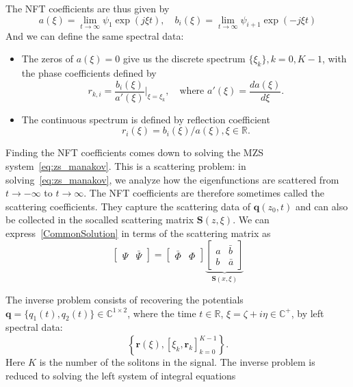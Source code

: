 The NFT coefficients are thus given by
$$
a(\xi)=\lim _{t \rightarrow \infty} \psi_1 \exp (j \xi t), \quad b_i(\xi)=\lim _{t \rightarrow \infty} \psi_{i+1} \exp (-j \xi t)
$$
And we can define the same spectral data:
\begin{itemize}
    \item The zeros of \(a(\xi) = 0\) give us the discrete spectrum \(\{\xi_k\}, k = 0, K - 1\),
    with the phase coefficients defined by
    \begin{equation}
        r_{k,i} = \frac{b_i(\xi)}{a'(\xi)} \Bigg|_{\xi=\xi_k}, \quad \text{where } a'(\xi) = \frac{da(\xi)}{d \xi}.
        \label{eq:manakov_rk}
    \end{equation}
    \item The continuous spectrum is defined by reflection coefficient 
    \begin{equation}
        r_i(\xi) = b_i(\xi)/a(\xi), \xi \in \mathbb{R} {.}
        \label{eq:manakov_r}
    \end{equation}
\end{itemize}

Finding the NFT coefficients comes down to solving the MZS system~\eqref{eq:zs_manakov}. This is a scattering problem: in solving~\eqref{eq:zs_manakov}, we analyze how the eigenfunctions are scattered from $t \rightarrow-\infty$ to $t \rightarrow \infty$. The NFT coefficients are therefore sometimes called the scattering coefficients. They capture the scattering data of $\mathbf{q}\left(z_0, t\right)$ and can also be collected in the socalled scattering matrix $\mathbf{S}(z, \xi)$. We can express~\eqref{CommonSolution} in terms of the scattering matrix as
$$
\left[\begin{array}{ll}
\Psi & \bar{\Psi}
\end{array}\right]=\left[\begin{array}{ll}
\bar{\Phi} & \Phi
\end{array}\right] \underbrace{\left[\begin{array}{cc}
a & \bar{b} \\
b & \bar{a}
\end{array}\right]}_{\mathbf{S}(x, \xi)}
$$

%
The inverse problem consists of recovering the potentials $\mathbf{q} = \{q_1(t), q_2(t)\}\in \mathbb{C}^{1\times2}$, where the time $t \in \mathbb{R}$, $\xi=\zeta+i \eta \in \mathbb{C}^{+}$, by left spectral data:
%
\begin{equation}
    \left\{\mathbf{r}(\xi),\left[\xi_{k}, \mathbf{r}_{k}\right]_{k=0}^{K-1}\right\}.
\end{equation}
$$
$$
%
Here $K$ is the number of the solitons in the signal. The inverse problem is reduced to solving the left system of integral equations

